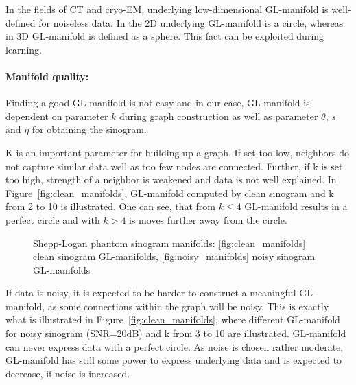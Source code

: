 \begin{tcolorbox}[colback=red!5!white,colframe=red!75!black]
    In the fields of CT and cryo-EM, underlying low-dimensional GL-manifold is well-defined for noiseless data.
    In the 2D underlying GL-manifold is a circle, whereas in 3D  GL-manifold is defined as a sphere.
    This fact can be exploited during learning.
\end{tcolorbox}

\paragraph{Manifold quality:}

Finding a good GL-manifold is not easy and in our case, GL-manifold is dependent on parameter $k$ during graph construction
as well as parameter $\theta$, $s$ and $\eta$ for obtaining the sinogram.

K is an important parameter for building up a graph. If set too low, neighbors
do not capture similar data well as too few nodes are connected. 
Further, if k is set too high, strength of a neighbor 
is weakened and data is not well explained.
In Figure~\ref{fig:clean_manifolds}, GL-manifold computed by clean sinogram and k from 2 to 10 is illustrated.
One can see, that from $k \leq 4$ GL-manifold results in a perfect circle and with $k >  4$ is moves 
further away from the circle. 


\begin{figure}[H]
    \centering
    \hfill
    \hfill
    \hfill
    \caption{Shepp-Logan phantom sinogram manifolds:
    \ref{fig:clean_manifolds} clean sinogram GL-manifolds,
    \ref{fig:noisy_manifolds} noisy sinogram GL-manifolds}
\end{figure}

If data is noisy, it is expected to be harder to construct a meaningful GL-manifold, as some connections within
the graph will be noisy. This is exactly what is illustrated in Figure~\ref{fig:clean_manifolds}, where 
different GL-manifold for noisy sinogram (SNR=20dB) and k from 3 to 10 are illustrated.
GL-manifold can never express data with a perfect circle. As noise is chosen rather moderate, GL-manifold has still some 
power to express underlying data and is expected to decrease, if noise is increased.


